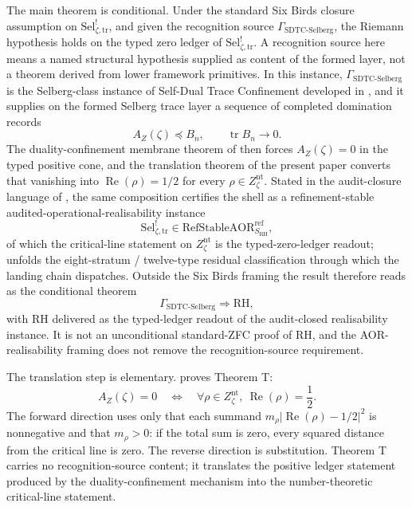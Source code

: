 \documentclass[11pt]{article}
\DeclareMathOperator{\trace}{tr}
\DeclareMathOperator{\Real}{Re}
\newcommand{\Znt}{Z_{\zeta}^{\mathrm{nt}}}
\newcommand{\AZ}{A_{Z}(\zeta)}
\newcommand{\Sel}{\mathrm{Sel}^{!}_{\zeta,\mathrm{tr}}}
\newcommand{\GamSDTCSelberg}{\Gamma_{\mathrm{SDTC\text{-}Selberg}}}
\theoremstyle{definition}
\begin{document}
The main theorem is conditional.  Under the standard Six Birds
closure assumption on \(\Sel\), and given the recognition source
\(\GamSDTCSelberg\), the Riemann hypothesis holds on the typed zero
ledger of \(\Sel\).  A recognition source here means a named
structural hypothesis supplied as content of the formed layer, not
a theorem derived from lower framework primitives.  In this
instance, \(\GamSDTCSelberg\) is the Selberg-class instance of
Self-Dual Trace Confinement developed in \cite{TsiokosSDTC2026},
and it supplies on the formed Selberg trace layer a sequence of
completed domination records
\[
  \AZ \preceq B_n,
  \qquad
  \trace B_n \to 0.
\]
The duality-confinement membrane theorem of \cite{TsiokosSDTC2026}
then forces \(\AZ=0\) in the typed positive cone, and the
translation theorem of the present paper converts that vanishing
into \(\Real(\rho)=1/2\) for every \(\rho\in\Znt\).  Stated in the
audit-closure language of \citet{TsiokosAOR2026}, the same
composition certifies the shell as a refinement-stable
audited-operational-realisability instance
\[
  \Sel\in\mathrm{RefStableAOR}^{\mathrm{ref}}_{S_{\mathrm{RH}}},
\]
of which the critical-line statement on \(\Znt\) is the
typed-zero-ledger readout;  unfolds the
eight-stratum / twelve-type residual classification through which
the landing chain dispatches.  Outside the Six Birds framing the
result therefore reads as the conditional theorem
\[
  \GamSDTCSelberg \Longrightarrow \mathrm{RH},
\]
with \(\mathrm{RH}\) delivered as the typed-ledger readout of the
audit-closed realisability instance.  It is not an unconditional
standard-ZFC proof of RH, and the AOR-realisability framing does
not remove the recognition-source requirement.

The translation step is elementary.  
proves Theorem T:
\[
  \AZ=0
  \quad\Longleftrightarrow\quad
  \forall \rho\in\Znt,\ \Real(\rho)=\frac12.
\]
The forward direction uses only that each summand
\(m_\rho |\Real(\rho)-1/2|^2\) is nonnegative and that
\(m_\rho>0\): if the total sum is zero, every squared distance from
the critical line is zero.  The reverse direction is substitution.
Theorem T carries no recognition-source content; it translates the
positive ledger statement produced by the duality-confinement
mechanism into the number-theoretic critical-line statement.
\end{document}
